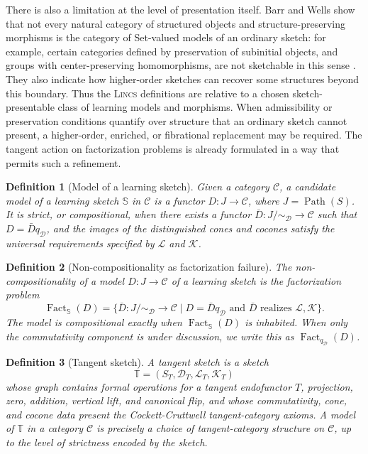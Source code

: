 \documentclass{article}
\newtheorem{definition}{Definition}
\newcommand{\C}{\mathcal{C}}
\newcommand{\Fact}{\operatorname{Fact}}
\newcommand{\Path}{\operatorname{Path}}
\begin{document}
There is also a limitation at the level of presentation itself.  Barr and
Wells show that not every natural category of structured objects and
structure-preserving morphisms is the category of Set-valued models of an
ordinary sketch: for example, certain categories defined by preservation of
subinitial objects, and groups with center-preserving homomorphisms, are not
sketchable in this sense \citep{barr1992limitations}.  They also indicate how
higher-order sketches can recover some structures beyond this boundary.  Thus
the \textsc{Lincs}   definitions are relative to a chosen sketch-presentable class of
learning models and morphisms.  When admissibility or preservation conditions
quantify over structure that an ordinary sketch cannot present, a higher-order,
enriched, or fibrational replacement may be required.  The tangent action on
factorization problems is already formulated in a way that permits such a
refinement.

\begin{definition}[Model of a learning sketch]
Given a category \(\C\), a candidate model of a learning sketch \(\mathbb S\) in \(\C\) is a functor \(D:J\to\C\), where \(J=\Path(S)\). It is strict, or compositional, when there exists a functor \(\bar D:J/{\sim_{\mathcal D}}\to\C\) such that \(D=\bar Dq_{\mathcal D}\), and the images of the distinguished cones and cocones satisfy the universal requirements specified by \(\mathcal L\) and \(\mathcal K\).
\end{definition}

\begin{definition}[Non-compositionality as factorization failure]
The non-compositionality of a model \(D:J\to\C\) of a learning sketch is the factorization problem
\[
\Fact_{\mathbb S}(D)=\{\bar D:J/{\sim_{\mathcal D}}\to\C\mid D=\bar Dq_{\mathcal D}\text{ and }\bar D\text{ realizes }\mathcal L,\mathcal K\}.
\]
The model is compositional exactly when \(\Fact_{\mathbb S}(D)\) is inhabited. When only the commutativity component is under discussion, we write this as \(\Fact_{q_{\mathcal D}}(D)\).
\end{definition}

\begin{definition}[Tangent sketch]
A tangent sketch is a sketch
\[
\mathbb T=(S_T,\mathcal D_T,\mathcal L_T,\mathcal K_T)
\]
whose graph contains formal operations for a tangent endofunctor \(T\), projection, zero, addition, vertical lift, and canonical flip, and whose commutativity, cone, and cocone data present the Cockett-Cruttwell tangent-category axioms. A model of \(\mathbb T\) in a category \(\C\) is precisely a choice of tangent-category structure on \(\C\), up to the level of strictness encoded by the sketch.
\end{definition}
\end{document}
